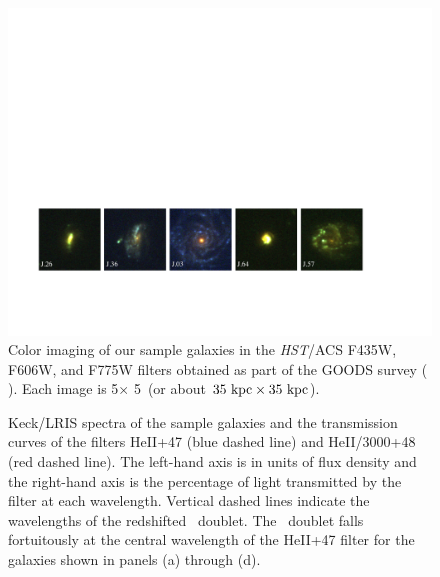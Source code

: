 \documentclass[trackchanges,twocolumn]{aastex62}
\begin{document}
\begin{figure}[!ht]
\centering
\includegraphics[scale=.75]{figure1.pdf}%
\caption{Color imaging of our sample galaxies in the \emph{HST}/ACS F435W, F606W, and F775W filters obtained as part of the GOODS survey (\citeauthor{Giavalisco2004} \citeyear{Giavalisco2004}). Each image is 5\arcsec $\times$ 5\arcsec\ (or about $35 \rm \ kpc \times 35 \rm \ kpc$).\label{fig:hstims}}
\end{figure}

\begin{figure}[!h]
\centering
{}
\caption{Keck/LRIS spectra of the sample galaxies and the transmission curves of the filters HeII+47 (blue dashed line) and HeII/3000+48 (red dashed line). The left-hand axis is in units of flux density and the right-hand axis is the percentage of light transmitted by the filter at each wavelength. Vertical dashed lines indicate the wavelengths of the redshifted \ doublet. The \ doublet falls fortuitously at the central wavelength of the HeII+47 filter for the galaxies shown in panels (a) through (d).}
\label{fig:spec_images}
\end{figure}
\end{document}
